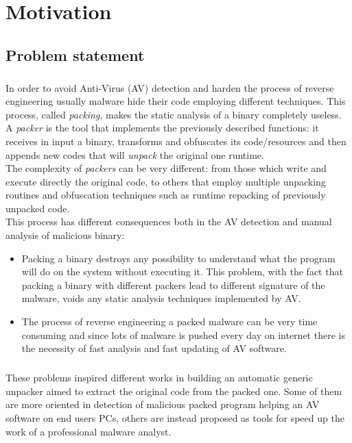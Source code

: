 \chapter{Motivation}
\label{chapter2}
\thispagestyle{empty}

\section{Problem statement}
\paragraph{}
In order to avoid Anti-Virus (AV) detection and harden the process of reverse engineering usually malware hide their code employing different techniques. This process, called \textit{packing}, makes the static analysis of a binary completely useless.\\
A \textit{packer} is the tool that implements the previously described functions: it receives in input a binary, transforms and obfuscates its code/resources and then appends new codes that will \textit{unpack} the original one runtime.\\
The complexity of \textit{packers} can be very different: from those which write and execute directly the original code, to others that employ multiple unpacking routines and obfuscation techniques such as runtime repacking of previously unpacked code.\\
This process has different consequences both in the AV detection and manual analysis of malicious binary:
\begin{itemize}
\item Packing a binary destroys any possibility to understand what the program will do on the system without executing it. This problem, with the fact that packing a binary with different packers lead to different signature of the malware, voids any static analysis techniques implemented by AV. 
\item The process of reverse engineering a packed malware can be very time consuming and since lots of malware is pushed every day on internet there is the necessity of fast analysis and fast updating of AV software.
\end{itemize}
\paragraph{}
These problems inspired different works in building an automatic generic unpacker aimed to extract the original code from the packed one. Some of them are more oriented in detection of malicious packed program helping an AV software on end users PCs, others are instead proposed as tools for speed up the work of a professional malware analyst.

